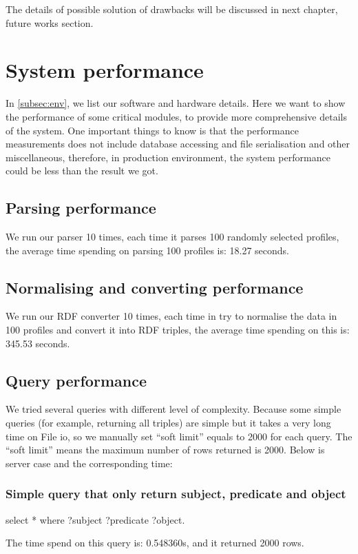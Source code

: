 The details of possible solution of drawbacks will be discussed in next chapter, future works section.

\section{System performance}

In \autoref{subsec:env}, we list our software and hardware details. Here we want to show the performance of some critical modules, to provide more comprehensive details of the system. One important things to know is that the performance measurements does not include database accessing and file serialisation and other miscellaneous, therefore, in production environment, the system performance could be less than the result we got.

\subsection{Parsing performance}
We run our parser 10 times, each time it parses 100 randomly selected profiles, the average time spending on parsing 100 profiles is: 18.27 seconds.

\subsection{Normalising and converting performance}
We run our RDF converter 10 times, each time in try to normalise the data in 100 profiles and convert it into RDF triples, the average time spending on this is: 345.53 seconds.

\subsection{Query performance}
We tried several queries with different level of complexity. Because some simple queries (for example, returning all triples) are simple but it takes a very long time on File \acrshort{io}, so we manually set ``soft limit'' equals to 2000 for each query. The ``soft limit'' means the maximum number of rows returned is 2000. Below is server case and the corresponding time:

\subsubsection{Simple query that only return subject, predicate and object}
\begin{verbatimtab}
	select * where {?subject ?predicate ?object. }
\end{verbatimtab}
The time spend on this query is: 0.548360s, and it returned 2000 rows.

